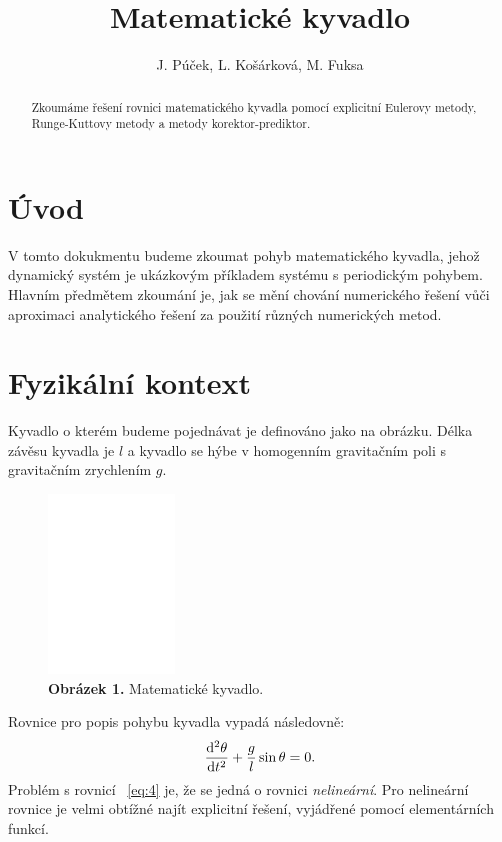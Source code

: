 \documentclass[reqno, a4paper]{amsart}
\author{J. Púček, L. Košárková, M. Fuksa}
\title{Matematické kyvadlo}
\begin{document}
	
	\begin{abstract}
		Zkoumáme řešení rovnici matematického kyvadla pomocí explicitní Eulerovy metody, Runge-Kuttovy metody a metody korektor-prediktor.
	\end{abstract}
	
	\maketitle
	
		\tableofcontents
		
		\section{Úvod}
		\label{sec:Úvod}
		
		V tomto dokukmentu budeme zkoumat pohyb matematického kyvadla, jehož dynamický systém je ukázkovým příkladem systému s periodickým pohybem. Hlavním předmětem zkoumání je, jak se mění chování numerického řešení vůči aproximaci analytického řešení za použití různých numerických metod.
		
		\section{Fyzikální kontext}
		\label{sec:Fyzikální kontext}
		Kyvadlo o kterém budeme pojednávat je definováno jako na obrázku. Délka závěsu kyvadla je $l$ a kyvadlo se hýbe v homogenním gravitačním poli s gravitačním zrychlením $g$.
		
		\begin{figure}[h]
			\centering
			\includegraphics[width=0.3\textwidth]{pendulum-intro}
			\caption*{\textbf{Obrázek 1.} Matematické kyvadlo.}  
			\label{fig:pendulum-intro}
		\end{figure}
		
		Rovnice pro popis pohybu kyvadla vypadá následovně:
		\begin{equation}
			\label{eq:4}
			\frac{\mathrm{d}^2 {\theta}}{\mathrm{d} {t}^2} + \frac{g}{l} \sin \theta = 0.
		\end{equation}
		Problém s rovnicí ~\eqref{eq:4} je, že se jedná o rovnici \emph{nelineární}. Pro nelineární rovnice je velmi obtížné najít explicitní řešení, vyjádřené pomocí elementárních funkcí.
		
\end{document}
